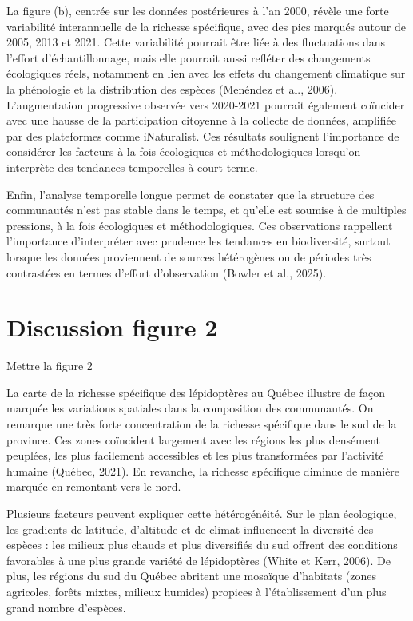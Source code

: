 \documentclass[9pt,twocolumn,twoside,]{pnas-new}
\begin{document}
La figure (b), centrée sur les données postérieures à l'an 2000, révèle
une forte variabilité interannuelle de la richesse spécifique, avec des
pics marqués autour de 2005, 2013 et 2021. Cette variabilité pourrait
être liée à des fluctuations dans l'effort d'échantillonnage, mais elle
pourrait aussi refléter des changements écologiques réels, notamment en
lien avec les effets du changement climatique sur la phénologie et la
distribution des espèces (Menéndez et al., 2006). L'augmentation
progressive observée vers 2020-2021 pourrait également coïncider avec
une hausse de la participation citoyenne à la collecte de données,
amplifiée par des plateformes comme iNaturalist. Ces résultats
soulignent l'importance de considérer les facteurs à la fois écologiques
et méthodologiques lorsqu'on interprète des tendances temporelles à
court terme.

Enfin, l'analyse temporelle longue permet de constater que la structure
des communautés n'est pas stable dans le temps, et qu'elle est soumise à
de multiples pressions, à la fois écologiques et méthodologiques. Ces
observations rappellent l'importance d'interpréter avec prudence les
tendances en biodiversité, surtout lorsque les données proviennent de
sources hétérogènes ou de périodes très contrastées en termes d'effort
d'observation (Bowler et al., 2025).

\section*{Discussion figure 2}\label{discussion-figure-2}

Mettre la figure 2

La carte de la richesse spécifique des lépidoptères au Québec illustre
de façon marquée les variations spatiales dans la composition des
communautés. On remarque une très forte concentration de la richesse
spécifique dans le sud de la province. Ces zones coïncident largement
avec les régions les plus densément peuplées, les plus facilement
accessibles et les plus transformées par l'activité humaine (Québec,
2021). En revanche, la richesse spécifique diminue de manière marquée en
remontant vers le nord.

Plusieurs facteurs peuvent expliquer cette hétérogénéité. Sur le plan
écologique, les gradients de latitude, d'altitude et de climat
influencent la diversité des espèces : les milieux plus chauds et plus
diversifiés du sud offrent des conditions favorables à une plus grande
variété de lépidoptères (White et Kerr, 2006). De plus, les régions du
sud du Québec abritent une mosaïque d'habitats (zones agricoles, forêts
mixtes, milieux humides) propices à l'établissement d'un plus grand
nombre d'espèces.
\end{document}
